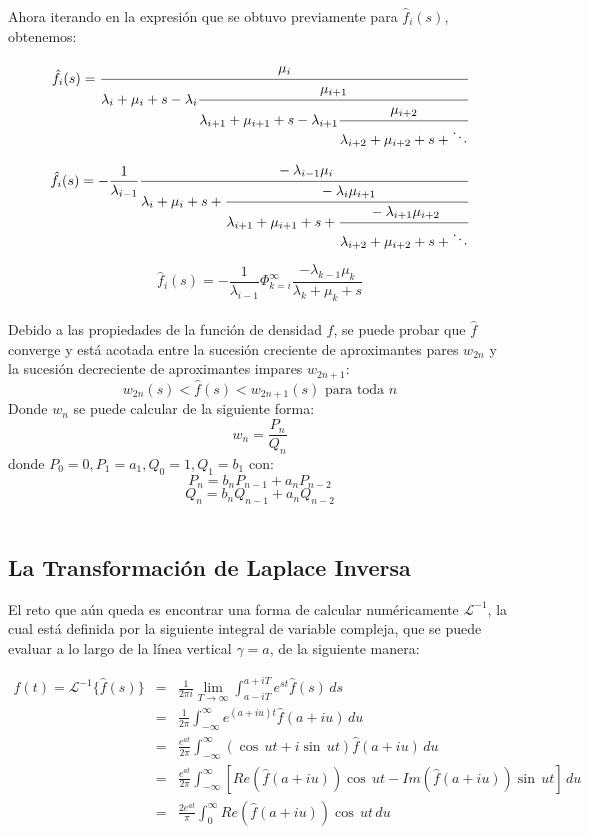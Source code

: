 \documentclass[11pt]{article}
\numberwithin{equation}{section} %
\begin{document}
Ahora iterando en la expresión que se obtuvo previamente para $\hat{f}_i(s)$, obtenemos:

\[
\hat{f}_i (s) = \cfrac{\mu_{i}}{\lambda_{i}+\mu_{i} + s - \lambda_{i}
\cfrac{\mu_{i+1}}{\lambda_{i+1}+\mu_{i+1} + s - \lambda_{i+1}
\cfrac{\mu_{i+2}}{\lambda_{i+2}+\mu_{i+2} + s + \ddots}}}
\]

\[
\hat{f}_i (s) = -\frac{1}{\lambda_{i-1}} \cfrac{-\lambda_{i-1}\mu_{i}}{\lambda_{i}+\mu_{i} + s +
\cfrac{-\lambda_{i}\mu_{i+1}}{\lambda_{i+1}+\mu_{i+1} + s +
\cfrac{-\lambda_{i+1}\mu_{i+2}}{\lambda_{i+2}+\mu_{i+2} + s + \ddots}}}
\]

\begin{equation}
\hat{f}_i (s) = -\frac{1}{\lambda_{i-1}}\Phi_{k=i}^{\infty}\frac{-\lambda_{k-1}\mu_{k}}{\lambda_{k}+\mu_{k}+s}
\end{equation}\\

Debido a las propiedades de la función de densidad $f$, se puede probar \cite{abate1999} que $\hat{f}$ converge y está acotada entre la sucesión creciente de aproximantes pares $w_{2n}$ y la sucesión decreciente de aproximantes impares $w_{2n+1}$:
\[
w_{2n}(s)<\hat{f}(s)<w_{2n+1}(s) \text{ para toda }n 
\]
Donde $w_n$ se puede calcular de la siguiente forma:
\[
w_n=\frac{P_n}{Q_n}
\]
donde $P_0=0, P_1=a_1,Q_0=1,Q_1=b_1$ con:
\[
P_n=b_n P_{n-1}+a_n P_{n-2}
\]
\[
Q_n=b_n Q_{n-1}+a_n Q_{n-2}
\]
\\

\subsection{La Transformación de Laplace Inversa}

El reto que aún queda es encontrar una forma de calcular numéricamente $\mathcal{L}^{-1}$, la cual está definida por la siguiente integral de variable compleja, que se puede evaluar a lo largo de la línea vertical $\gamma=a$, de la siguiente manera:

\[
\begin{array}{rcl}
f(t) = \mathcal{L}^{-1} \{\hat{f}(s)\} & = & \displaystyle \frac{1}{2 \pi i} \lim_{T\to\infty}\int_{ a - i T}^{ a + i T} e^{st} \hat{f}(s)\,ds\\
& = & \displaystyle \frac{1}{2 \pi} \int_{ -\infty}^{ \infty} e^{(a+iu)t} \hat{f}(a+iu)\,du\\
& = & \displaystyle \frac{e^{at}}{2 \pi} \int_{ -\infty}^{ \infty} (\cos\,ut + i \sin\,ut)\hat{f}(a+iu)\,du\\
& = & \displaystyle \frac{e^{at}}{2 \pi} \int_{ -\infty}^{ \infty} \left[Re(\hat{f}(a+iu))\cos\,ut - Im(\hat{f}(a+iu))\sin\,ut\right]\,du\\
& = & \displaystyle \frac{2e^{at}}{\pi} \int_{0}^{ \infty} Re(\hat{f}(a+iu))\cos\,ut\,du\\
\end{array}
\]
\end{document}
